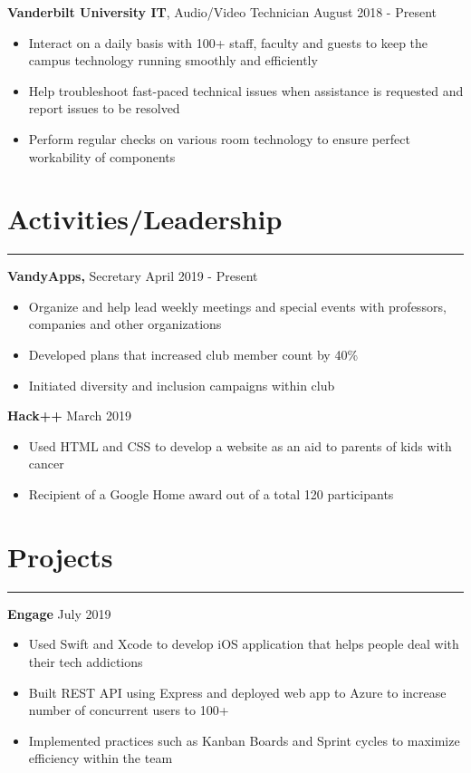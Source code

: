 \documentclass[11pt]{article}
\newcommand{\resumesection}[1]{\vspace{-0.4cm}\section*{#1}\vspace{-0.2cm}\hrule\vspace{0.2cm}}
\begin{document}
\textbf{Vanderbilt University IT}, Audio/Video Technician \hfill August 2018 - Present
\begin{itemize}
	\item Interact on a daily basis with 100+ staff, faculty and guests to keep the campus technology running smoothly and efficiently
	\item Help troubleshoot fast-paced technical issues when assistance is requested and report issues to be resolved
	\item Perform regular checks on various room technology to ensure perfect workability of components
\end{itemize}


\resumesection{Activities/Leadership}

\textbf{VandyApps,} Secretary
\hfill April 2019 - Present
\begin{itemize}
	\item Organize and help lead weekly meetings and special events with professors, companies and other organizations
	\item Developed plans that increased club member count by 40\%
	\item Initiated diversity and inclusion campaigns within club
	\\[-0.7\baselineskip]
\end{itemize}

\textbf{Hack++}
\hfill March 2019
\begin{itemize}
    \item Used HTML and CSS to develop a website as an aid to parents of kids with cancer
    \item Recipient of a Google Home award out of a total 120 participants 
\end{itemize}


\resumesection{Projects}

\textbf{Engage}
\hfill July 2019
\begin{itemize}
	\item Used Swift and Xcode to develop iOS application that helps people deal with their tech addictions
	\item Built REST API using Express and deployed web app to Azure to increase number of concurrent users to 100+
	\item Implemented practices such as Kanban Boards and Sprint cycles to maximize efficiency within the team
	\\[-0.7\baselineskip]
\end{itemize}
\end{document}
